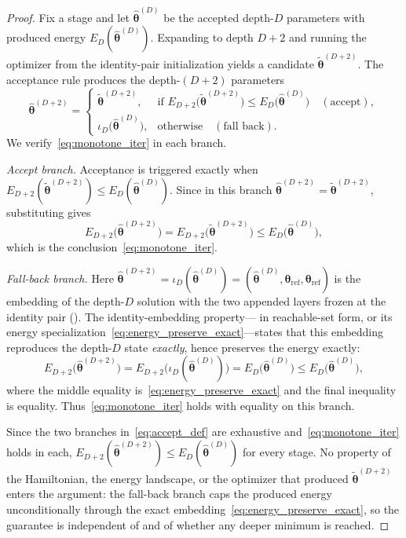 \documentclass[11pt]{article}
\theoremstyle{plain}
\theoremstyle{plain}
\begin{document}
\begin{proof}
Fix a stage and let $\hat{\bm\theta}^{(D)}$ be the accepted depth-$D$
parameters with produced energy $E_D(\hat{\bm\theta}^{(D)})$.  Expanding
to depth $D{+}2$ and running the optimizer from the identity-pair
initialization yields a candidate $\tilde{\bm\theta}^{(D+2)}$.  The
acceptance rule produces the depth-$(D{+}2)$ parameters
\begin{equation}\label{eq:accept_def}
  \hat{\bm\theta}^{(D+2)}=
  \begin{cases}
    \tilde{\bm\theta}^{(D+2)},
      & \text{if } E_{D+2}\bigl(\tilde{\bm\theta}^{(D+2)}\bigr)
        \le E_D\bigl(\hat{\bm\theta}^{(D)}\bigr)
        \quad(\text{accept}),\\[2pt]
    \iota_D\bigl(\hat{\bm\theta}^{(D)}\bigr),
      & \text{otherwise}\quad(\text{fall back}).
  \end{cases}
\end{equation}
We verify~\eqref{eq:monotone_iter} in each branch.

\emph{Accept branch.}  Acceptance is triggered exactly when
$E_{D+2}(\tilde{\bm\theta}^{(D+2)})\le E_D(\hat{\bm\theta}^{(D)})$.
Since in this branch
$\hat{\bm\theta}^{(D+2)}=\tilde{\bm\theta}^{(D+2)}$, substituting gives
\begin{equation}\label{eq:accept_branch}
  E_{D+2}\bigl(\hat{\bm\theta}^{(D+2)}\bigr)
  =E_{D+2}\bigl(\tilde{\bm\theta}^{(D+2)}\bigr)
  \le E_D\bigl(\hat{\bm\theta}^{(D)}\bigr),
\end{equation}
which is the conclusion~\eqref{eq:monotone_iter}.

\emph{Fall-back branch.}  Here
$\hat{\bm\theta}^{(D+2)}=\iota_D(\hat{\bm\theta}^{(D)})
=(\hat{\bm\theta}^{(D)},\bm\theta_{\mathrm{ref}},\bm\theta_{\mathrm{ref}})$
is the embedding of the depth-$D$ solution with the two appended layers
frozen at the identity pair ().  The
identity-embedding property--- in reachable-set form,
or its energy specialization~\eqref{eq:energy_preserve_exact}---states
that this embedding reproduces the depth-$D$ state \emph{exactly}, hence
preserves the energy exactly:
\begin{equation}\label{eq:fallback_branch}
  E_{D+2}\bigl(\hat{\bm\theta}^{(D+2)}\bigr)
  =E_{D+2}\bigl(\iota_D(\hat{\bm\theta}^{(D)})\bigr)
  =E_D\bigl(\hat{\bm\theta}^{(D)}\bigr)
  \le E_D\bigl(\hat{\bm\theta}^{(D)}\bigr),
\end{equation}
where the middle equality is~\eqref{eq:energy_preserve_exact} and the
final inequality is equality.  Thus~\eqref{eq:monotone_iter} holds with
equality on this branch.

Since the two branches in~\eqref{eq:accept_def} are exhaustive
and~\eqref{eq:monotone_iter} holds in each,
$E_{D+2}(\hat{\bm\theta}^{(D+2)})\le E_D(\hat{\bm\theta}^{(D)})$ for
every stage.  No property of the Hamiltonian, the energy landscape, or
the optimizer that produced $\tilde{\bm\theta}^{(D+2)}$ enters the
argument: the fall-back branch caps the produced energy unconditionally
through the exact embedding~\eqref{eq:energy_preserve_exact}, so the
guarantee is independent of  and of whether any
deeper minimum is reached.
\end{proof}
\end{document}
